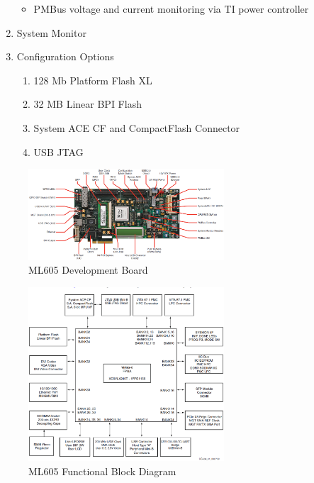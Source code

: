 \begin{enumerate}
  \begin{itemize}
    \item PMBus voltage and current monitoring via TI power controller
  \end{itemize}

  \item System Monitor
  \item Configuration Options
  \begin{enumerate}
    \item 128 Mb Platform Flash XL
    \item 32 MB Linear BPI Flash
    \item System ACE CF and CompactFlash Connector
    \item USB JTAG
  \end{enumerate}

\end{enumerate}

\begin{figure}[htbp]
    \centering
    \includegraphics[width=0.65\textwidth]{./figures/ml605}
    \caption{ ML605 Development Board
    \label{fig:ml605}}
\end{figure}

\begin{figure}[htbp]
    \centering
    \includegraphics[width=0.65\textwidth]{./figures/ml605_bd}
    \caption{ ML605 Functional Block Diagram
    \label{fig:ml605bd}}
\end{figure}

